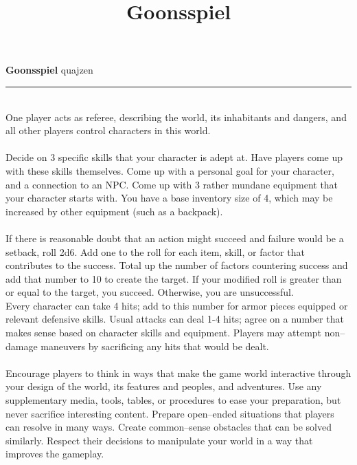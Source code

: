 \documentclass{article}
\title{Goonsspiel}
\begin{document}
\vfill
{\centering \Large \textbf{Goonsspiel}} \hfill quajzen \hrule

\begin{multicols}{2}

 \\
  One player acts as referee, describing the world, its inhabitants and dangers, and all other players control characters in this world. \\

 \\

  Decide on 3 specific skills that your character is adept at.
  Have players come up with these skills themselves.
  Come up with a personal goal for your character, and a connection to an NPC.
  Come up with 3 rather mundane equipment that your character starts with.
  You have a base inventory size of 4, which may be increased by other equipment (such as a backpack). \\

 \\

  If there is reasonable doubt that an action might succeed and failure would be a setback, roll 2d6.
  Add one to the roll for each item, skill, or factor that contributes to the success.
  Total up the number of factors countering success and add that number to 10 to create the target.
  If your modified roll is greater than or equal to the target, you succeed.
  Otherwise, you are unsuccessful. \\

  Every character can take 4 hits; add to this number for armor pieces equipped or relevant defensive skills.
  Usual attacks can deal 1-4 hits; agree on a number that makes sense based on character skills and equipment.
  Players may attempt non--damage maneuvers by sacrificing any hits that would be dealt. \\
  
   \\


  Encourage players to think in ways that make the game world interactive through your design of the world, its features and peoples, and adventures.
  Use any supplementary media, tools, tables, or procedures to ease your preparation, but never sacrifice interesting content.
  Prepare open--ended situations that players can resolve in many ways.
  Create common--sense obstacles that can be solved similarly.
  Respect their decisions to manipulate your world in a way that improves the gameplay. \\


\end{multicols}
\end{document}
